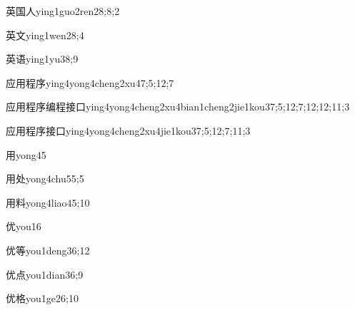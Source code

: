 \begin{verbete}{英国人}{ying1guo2ren2}{8;8;2}
\end{verbete}
\begin{verbete}{英文}{ying1wen2}{8;4}
\end{verbete}
\begin{verbete}{英语}{ying1yu3}{8;9}
\end{verbete}
\begin{verbete}{应用程序}{ying4yong4cheng2xu4}{7;5;12;7}
\end{verbete}
\begin{extragrande}{应用程序编程接口}{ying4yong4cheng2xu4bian1cheng2jie1kou3}{7;5;12;7;12;12;11;3}
\end{extragrande}
\begin{verbete}{应用程序接口}{ying4yong4cheng2xu4jie1kou3}{7;5;12;7;11;3}
\end{verbete}
\begin{verbete}{用}{yong4}{5}
\end{verbete}
\begin{verbete}{用处}{yong4chu5}{5;5}
\end{verbete}
\begin{verbete}{用料}{yong4liao4}{5;10}
\end{verbete}
\begin{verbete}{优}{you1}{6}
\end{verbete}
\begin{verbete}{优等}{you1deng3}{6;12}
\end{verbete}
\begin{verbete}{优点}{you1dian3}{6;9}
\end{verbete}
\begin{verbete}{优格}{you1ge2}{6;10}
\end{verbete}
